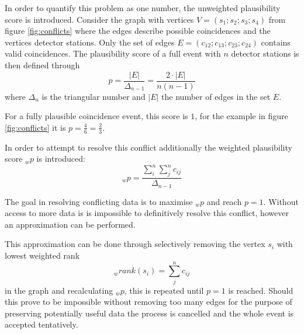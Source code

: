 \documentclass[abstract,toc,los,lof,english,10pt,glossary,acronyms,lotl]{jluthesis}
\begin{document}
In order to quantify this problem as one number, the unweighted plausibility score is introduced. Consider the graph with vertices $V = (s_1; s_2; s_3; s_4)$ from figure \ref{fig:conflicts} where the edges describe possible coincidences and the vertices detector stations. Only the set of edges $E = (c_{12}; c_{13}; c_{23}; c_{24})$ contains valid coincidences. The plausibility score of a full event with $n$ detector stations is then defined through
\begin{equation}
p = \frac{|E|}{\Delta_{n-1}}=\frac{2\cdot|E|}{n(n-1)}
\end{equation}
where $\Delta_n$ is the triangular number and $|E|$ the number of edges in the set $E$.

For a fully plausible coincidence event, this score is $1$, for the example in figure \ref{fig:conflicts} it is $p = \frac{4}{6}=\frac{2}{3}$.

In order to attempt to resolve this conflict additionally the weighted plausibility score $_wp$ is introduced:
\begin{equation}
	_wp = \frac{\sum^{n}_{i}\sum^{n}_{j} c_{ij}}{\Delta_{n-1}}
\end{equation}

The goal in resolving conflicting data is to maximise $_wp$ and reach $p=1$. Without access to more data is is impossible to definitively resolve this conflict, however an approximation can be performed.

This approximation can be done through selectively removing the vertex $s_i$ with lowest weighted rank
\begin{equation}
_wrank(s_i) = \sum_{j}^{n}c_{ij}
\end{equation}
in the graph and recalculating $_wp$, this is repeated until $p=1$ is reached. Should this prove to be impossible without removing too many edges for the purpose of preserving potentially useful data the process is cancelled and the whole event is accepted tentatively.
\end{document}
